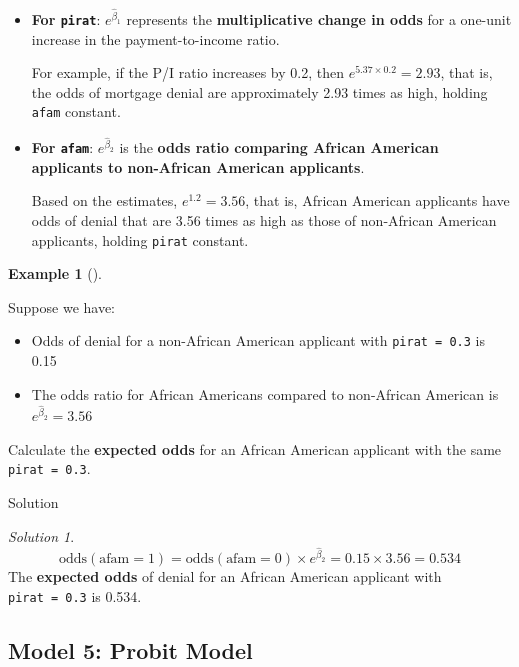 \documentclass[
  12pt,
  a4paper,
]{scrbook}
\providecommand{\tightlist}{%
  \setlength{\itemsep}{0pt}\setlength{\parskip}{0pt}}
\renewcommand{\tightlist}{\setlength{\itemsep}{0.5\baselineskip}\setlength{\parskip}{0.2\baselineskip}}
\theoremstyle{plain}
\theoremstyle{definition}
\newtheorem{example}{Example}[chapter]
\theoremstyle{remark}
\newtheorem{refsolution}{Solution}[chapter]
\begin{document}
\begin{itemize}
\item
  \textbf{For \texttt{pirat}}: \(e^{\hat{\beta}_1}\) represents the
  \textbf{multiplicative change in odds} for a one-unit increase in the
  payment-to-income ratio.

  For example, if the P/I ratio increases by 0.2, then
  \(e^{5.37\times 0.2} = 2.93\), that is, the odds of mortgage denial
  are approximately 2.93 times as high, holding \texttt{afam} constant.
\item
  \textbf{For \texttt{afam}}: \(e^{\hat{\beta}_2}\) is the \textbf{odds
  ratio comparing African American applicants to non-African American
  applicants}.

  Based on the estimates, \(e^{1.2} = 3.56\), that is, African American
  applicants have odds of denial that are 3.56 times as high as those of
  non-African American applicants, holding \texttt{pirat} constant.
\end{itemize}

\begin{example}[]\protect\hypertarget{exm-2}{}\label{exm-2}

Suppose we have:

\begin{itemize}
\tightlist
\item
  Odds of denial for a non-African American applicant with
  \texttt{pirat\ =\ 0.3} is 0.15
\item
  The odds ratio for African Americans compared to non-African American
  is \(e^{\hat{\beta}_2} = 3.56\)
\end{itemize}

Calculate the \textbf{expected odds} for an African American applicant
with the same \texttt{pirat\ =\ 0.3}.

\end{example}

Solution

\begin{refsolution}
\[
\text{odds}(\text{afam}=1) = \text{odds}(\text{afam}=0) \times e^{\hat{\beta}_2} = 0.15 \times 3.56 = 0.534
\] The \textbf{expected odds} of denial for an African American
applicant with \texttt{pirat\ =\ 0.3} is 0.534.

\label{sol-2}

\end{refsolution}

\subsection{Model 5: Probit Model}\label{model-5-probit-model}
\end{document}
